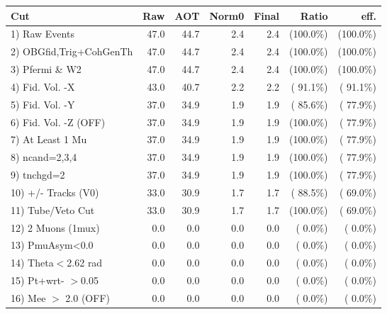  \begin{table}[h!]\centering
 \begin{tabular}{||l||r|r|r|r|r|r||}
 \hline
 \hline
 Cut & Raw & AOT & Norm0 & Final & Ratio & eff.       \\
 \hline
  1) Raw Events           &         47.0 &         44.7 &          2.4 &          2.4 & (100.0\%) & (100.0\%) \\
  2) OBGfid,Trig+CohGenTh &         47.0 &         44.7 &          2.4 &          2.4 & (100.0\%) & (100.0\%) \\
  3) Pfermi \& W2         &         47.0 &         44.7 &          2.4 &          2.4 & (100.0\%) & (100.0\%) \\
  4) Fid. Vol. -X         &         43.0 &         40.7 &          2.2 &          2.2 & ( 91.1\%) & ( 91.1\%) \\
  5) Fid. Vol. -Y         &         37.0 &         34.9 &          1.9 &          1.9 & ( 85.6\%) & ( 77.9\%) \\
  6) Fid. Vol. -Z (OFF)   &         37.0 &         34.9 &          1.9 &          1.9 & (100.0\%) & ( 77.9\%) \\
  7) At Least 1 Mu        &         37.0 &         34.9 &          1.9 &          1.9 & (100.0\%) & ( 77.9\%) \\
  8) ncand=2,3,4          &         37.0 &         34.9 &          1.9 &          1.9 & (100.0\%) & ( 77.9\%) \\
  9) tnchgd=2             &         37.0 &         34.9 &          1.9 &          1.9 & (100.0\%) & ( 77.9\%) \\
 10) +/- Tracks (V0)      &         33.0 &         30.9 &          1.7 &          1.7 & ( 88.5\%) & ( 69.0\%) \\
 11) Tube/Veto Cut        &         33.0 &         30.9 &          1.7 &          1.7 & (100.0\%) & ( 69.0\%) \\
 12) 2 Muons (1mux)       &          0.0 &          0.0 &          0.0 &          0.0 & (  0.0\%) & (  0.0\%) \\
 13) PmuAsym<0.0          &          0.0 &          0.0 &          0.0 &          0.0 & (  0.0\%) & (  0.0\%) \\
 14) Theta$<$2.62 rad     &          0.0 &          0.0 &          0.0 &          0.0 & (  0.0\%) & (  0.0\%) \\
 15) Pt+wrt- $>$0.05      &          0.0 &          0.0 &          0.0 &          0.0 & (  0.0\%) & (  0.0\%) \\
 16) Mee $>$ 2.0  (OFF)   &          0.0 &          0.0 &          0.0 &          0.0 & (  0.0\%) & (  0.0\%) \\

\end{tabular}
\end{table}
